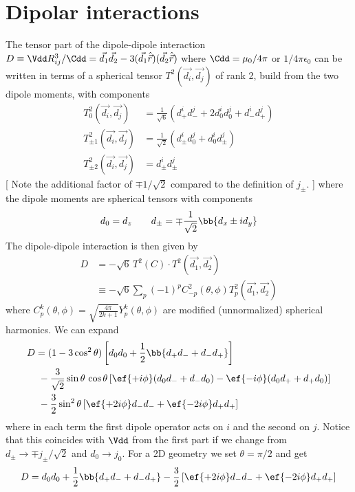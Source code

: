 \section{Dipolar interactions}
The tensor part of the dipole-dipole interaction $D\equiv \Vdd R_{ij}^3/\Cdd=\vec{d_1}\vec{d_2}-3(\vec{d_1}\hat{\vec{r}})(\vec{d_2}\hat{\vec{r}})$ where $\Cdd = \mu_0 /4\pi$ or $1/4\pi\epsilon_0$ can be written in terms of a spherical tensor $T^2(\vec{d_i},\vec{d_j})$ of rank 2, build from the two dipole moments, with components
\begin{align}
T^2_0(\vec{d_i},\vec{d_j}) &= \frac{1}{\sqrt{6}} (d^i_+ d^j_- + 2d^i_0 d^j_0 + d^i_{-} d^j_{+})\\
T^2_{\pm 1}(\vec{d_i},\vec{d_j}) &= \frac{1}{\sqrt{2}} (d^i_{\pm} d^j_0 + d^i_0 d^j_{\pm})\\
T^2_{\pm 2}(\vec{d_i},\vec{d_j}) &= d^i_{\pm} d^j_{\pm} \phantom{\frac{1}{\sqrt{42}}}
\end{align}
[ Note the additional factor of $\mp 1/\sqrt{2}$ compared to the definition of $j_\pm$. ]
where the dipole moments are spherical tensors with components
\begin{align}\label{eq:dipsph}
d_0 = d_z\qquad d_\pm = \mp\frac{1}{\sqrt{2}}\bb{d_x\pm i d_y}
\end{align}
The dipole-dipole interaction is then given by
\begin{align}
D &= -\sqrt{6} \,T^2(C)\cdot T^2(\vec{d_1},\vec{d_2})\\
&\equiv-\sqrt{6}  \sum_p (-1)^p C^2_{-p}(\theta,\phi) T^2_p(\vec{d_1},\vec{d_2})
\end{align}
where $C^k_p(\theta,\phi)=\sqrt{\frac{4\pi}{2k+1}} Y^k_p(\theta,\phi)$ are modified (unnormalized) spherical harmonics. We can expand
\begin{align}\label{eq:doperator}
D &= (1-3\cos^2 \theta) \left[d_0 d_0 + \frac{1}{2}\bb{d_+ d_- + d_- d_+} \right] \\
&\,\,-\frac{3}{\sqrt{2}}\sin\theta \,\cos\theta \left[ \ef{+i\phi} (d_0 d_- + d_- d_0) - \ef{-i\phi} (d_0 d_+ + d_+ d_0) \right]\\
&\,\,-\frac{3}{2}\sin^2\theta \left[ \ef{+2i\phi} d_- d_- + \ef{-2i\phi} d_+ d_+\right]
\end{align}
where in each term the first dipole operator acts on $i$ and the second on $j$. Notice that this coincides with $\Vdd$ from the first part if we change from $d_\pm \rightarrow \mp j_\pm/\sqrt{2}$ and $d_0\rightarrow j_0$.
For a 2D geometry we set $\theta=\pi/2$ and get
\begin{align}
D = d_0 d_0 + \frac{1}{2}\bb{d_+ d_- + d_- d_+} -\frac{3}{2} \left[ \ef{+2i\phi} d_- d_- + \ef{-2i\phi} d_+ d_+\right]
\end{align}
